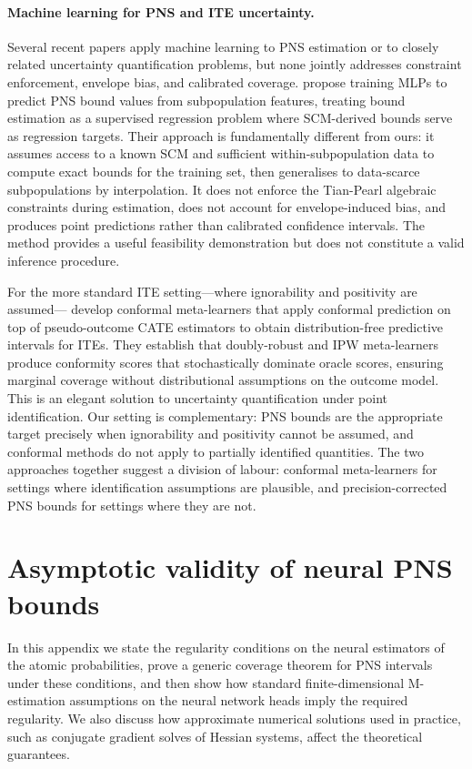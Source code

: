 \documentclass[accepted]{uai2026} %
\theoremstyle{plain}
\theoremstyle{definition}
\theoremstyle{remark}
\begin{document}
\paragraph{Machine learning for PNS and ITE uncertainty.}
Several recent papers apply machine learning to PNS estimation or to
closely related uncertainty quantification problems, but none jointly
addresses constraint enforcement, envelope bias, and calibrated coverage.
\citet{wang2025estimating} propose training MLPs to predict PNS bound
values from subpopulation features, treating bound estimation as a
supervised regression problem where SCM-derived bounds serve as
regression targets. Their approach is fundamentally different from
ours: it assumes access to a known SCM and sufficient within-subpopulation
data to compute exact bounds for the training set, then generalises to
data-scarce subpopulations by interpolation. It does not enforce the
Tian-Pearl algebraic constraints during estimation, does not account
for envelope-induced bias, and produces point predictions rather than
calibrated confidence intervals. The method provides a useful
feasibility demonstration but does not constitute a valid inference
procedure.

For the more standard ITE setting---where ignorability and positivity
are assumed---\citet{alaa2023conformal} develop conformal meta-learners
that apply conformal prediction on top of pseudo-outcome CATE estimators
to obtain distribution-free predictive intervals for ITEs. They
establish that doubly-robust and IPW meta-learners produce conformity
scores that stochastically dominate oracle scores, ensuring marginal
coverage without distributional assumptions on the outcome model. This
is an elegant solution to uncertainty quantification under point
identification. Our setting is complementary: PNS bounds are the
appropriate target precisely when ignorability and positivity cannot
be assumed, and conformal methods do not apply to partially identified
quantities. The two approaches together suggest a division of labour:
conformal meta-learners for settings where identification assumptions
are plausible, and precision-corrected PNS bounds for settings where
they are not.


\section{Asymptotic validity of neural PNS bounds}
\label{sec:pns-theory}

In this appendix we state the regularity conditions on the neural estimators of
the atomic probabilities, prove a generic coverage theorem for PNS intervals
under these conditions, and then show how standard finite-dimensional
M-estimation assumptions on the neural network heads imply the required
regularity. We also discuss how approximate numerical solutions used in
practice, such as conjugate gradient solves of Hessian systems, affect the
theoretical guarantees. 
\end{document}
